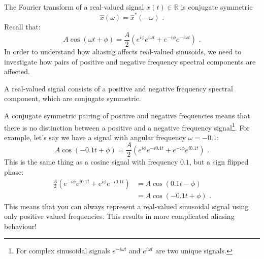 The Fourier transform of a real-valued signal $x(t)\in\mathbb{R}$ is
conjugate symmetric
\begin{equation}
  \hat{x}(\omega) = \hat{x}^*(-\omega)\,\,.
\end{equation}
\fi 
Recall that:
\begin{equation}
  A \cos(\omega t + \phi) = \frac{A}{2}(e^{i\phi}e^{i\omega t} + e^{-i\phi}e^{-i\omega t})\,\,.
\end{equation}
In order to understand how aliasing affects real-valued sinusoids, we
need to investigate how pairs of positive and negative frequency
spectral components are affected.
\begin{marginfigure}
  \begin{center}
  \end{center}
  \caption{A real-valued signal consists of a positive and negative frequency spectral component, 
  which are conjugate symmetric.}
\end{marginfigure}
A conjugate symmetric pairing of positive and negative frequencies
means that there is no distinction between a positive and a negative
frequency signal\footnote{For complex sinusoidal signals $e^{-i \omega
  t}$ and $e^{i \omega t}$ are two unique signals.}.  For example,
let's say we have a signal with angular frequency $\omega = -0.1$:
\begin{equation}
  A \cos(-0.1 t + \phi) = \frac{A}{2}(e^{i\phi}e^{-i0.1  t} + e^{-i\phi}e^{i0.1 t})\,\,.
\end{equation}
This is the same thing as a cosine signal with frequency $0.1$, but a
sign flipped phase:
\begin{align}
  \frac{A}{2}(e^{-i\phi}e^{i 0.1 t} + e^{i\phi}e^{-i 0.1 t}) & = A \cos(0.1 t - \phi)       \\
                                                             & = A \cos(-0.1 t + \phi)\,\,.
\end{align}
This means that you can always represent a real-valued sinusoidal
signal using only positive valued frequencies. This results in more
complicated aliasing behaviour!

